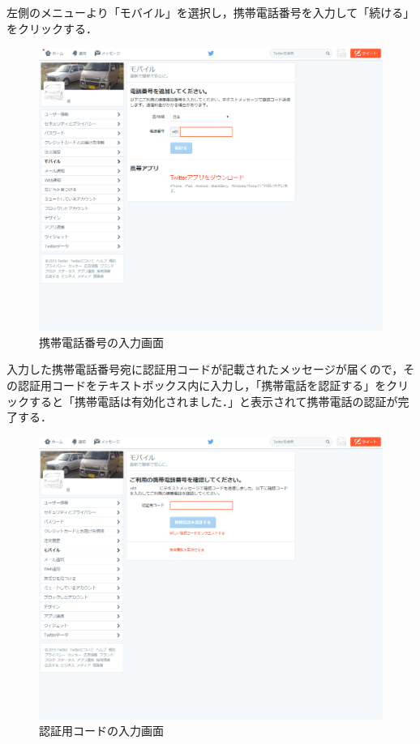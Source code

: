 左側のメニューより「モバイル」を選択し，携帯電話番号を入力して「続ける」をクリックする．

\begin{figure}[H]
\centering
\includegraphics[width=13cm]{TwitterMobile1.png}
\caption{携帯電話番号の入力画面}\label{mobile1}
\end{figure}

入力した携帯電話番号宛に認証用コードが記載されたメッセージが届くので，その認証用コードをテキストボックス内に入力し，「携帯電話を認証する」をクリックすると「携帯電話は有効化されました．」と表示されて携帯電話の認証が完了する．

\begin{figure}[H]
\centering
\includegraphics[width=13cm]{TwitterMobile2.png}
\caption{認証用コードの入力画面}\label{mobile2}
\end{figure}

